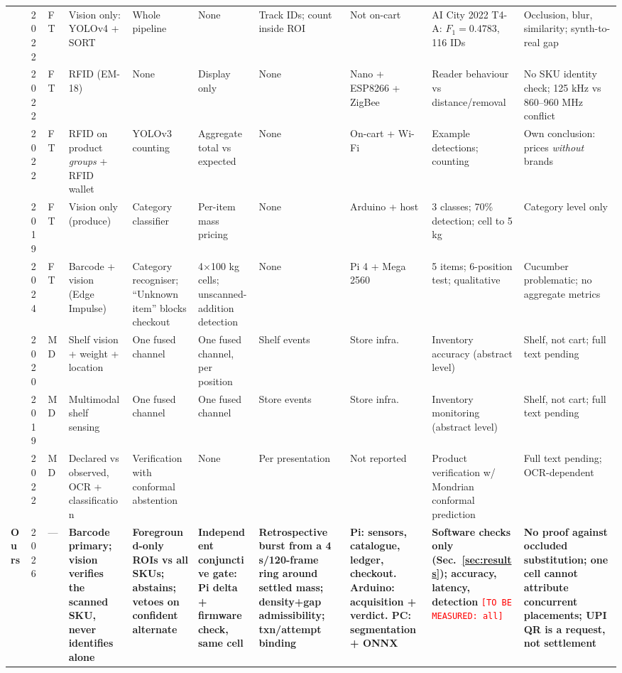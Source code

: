 \documentclass[conference]{IEEEtran}
\newcommand{\tbm}[1]{\textcolor{red}{\texttt{[TO BE MEASURED: #1]}}}
\begin{document}
\begin{table}[!t]
\begin{tabular}{@{}p{}p{}p{}p{}p{}p{}p{}p{}p{}p{}@{}}
\cite{R27} & 2022 & FT & Vision only: YOLOv4 + SORT & Whole pipeline & None & Track IDs; count inside ROI & Not on-cart & AI City 2022 T4-A: $F_1{=}0.4783$, 116 IDs & Occlusion, blur, similarity; synth-to-real gap \\
\cite{R11} & 2022 & FT & RFID (EM-18) & None & Display only & None & Nano + ESP8266 + ZigBee & Reader behaviour vs distance/removal & No SKU identity check; 125 kHz vs 860--960 MHz conflict \\
\cite{R12} & 2022 & FT & RFID on product \emph{groups} + RFID wallet & YOLOv3 counting & Aggregate total vs expected & None & On-cart + Wi-Fi & Example detections; counting & Own conclusion: prices \emph{without} brands \\
\cite{R04} & 2019 & FT & Vision only (produce) & Category classifier & Per-item mass pricing & None & Arduino + host & 3 classes; 70\% detection; cell to 5 kg & Category level only \\
\cite{R05} & 2024 & FT & Barcode + vision (Edge Impulse) & Category recogniser; ``Unknown item'' blocks checkout & 4$\times$100 kg cells; unscanned-addition detection & None & Pi 4 + Mega 2560 & 5 items; 6-position test; qualitative & Cucumber problematic; no aggregate metrics \\
\cite{R45} & 2020 & MD & Shelf vision + weight + location & One fused channel & One fused channel, per position & Shelf events & Store infra. & Inventory accuracy (abstract level) & Shelf, not cart; full text pending \\
\cite{R46} & 2019 & MD & Multimodal shelf sensing & One fused channel & One fused channel & Store events & Store infra. & Inventory monitoring (abstract level) & Shelf, not cart; full text pending \\
\cite{R51} & 2022 & MD & Declared vs observed, OCR + classification & Verification with conformal abstention & None & Per presentation & Not reported & Product verification w/ Mondrian conformal prediction & Full text pending; OCR-dependent \\
\midrule
\textbf{Ours} & 2026 & --- & \textbf{Barcode primary; vision verifies the scanned SKU, never identifies alone} & \textbf{Foreground-only ROIs vs all SKUs; abstains; vetoes on confident alternate} & \textbf{Independent conjunctive gate: Pi delta + firmware check, same cell} & \textbf{Retrospective burst from a 4 s/120-frame ring around settled mass; density+gap admissibility; txn/attempt binding} & \textbf{Pi: sensors, catalogue, ledger, checkout. Arduino: acquisition + verdict. PC: segmentation + ONNX} & \textbf{Software checks only (Sec.~\ref{sec:results}); accuracy, latency, detection} \tbm{all} & \textbf{No proof against occluded substitution; one cell cannot attribute concurrent placements; UPI QR is a request, not settlement} \\
\bottomrule
\end{tabular}
\end{table}
\end{document}
